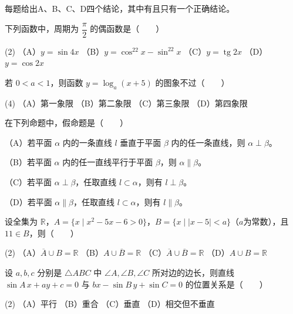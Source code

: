 每题给出A、B、C、D四个结论，其中有且只有一个正确结论。

\begin{question}
下列函数中，周期为 $\dfrac\pi2$ 的偶函数是\mbox{（　　）}

\begin{gkopts}(2)
\task （A）$y=\sin4x$
\task （B）$y=\cos^22x-\sin^22x$
\task （C）$y=\operatorname{tg}2x$
\task （D）$y=\cos2x$
\end{gkopts}

\end{question}
\begin{question}
若 $0<a<1$，则函数 $y=\log_a(x+5)$ 的图象不过\mbox{（　　）}

\begin{gkopts}(4)
\task （A）第一象限
\task （B）第二象限
\task （C）第三象限
\task （D）第四象限
\end{gkopts}

\end{question}
\begin{question}
在下列命题中，假命题是\mbox{（　　）}

（A）若平面 $\alpha$ 内的一条直线 $l$ 垂直于平面 $\beta$ 内的任一条直线，则 $\alpha\perp\beta$。

（B）若平面 $\alpha$ 内的任一直线平行于平面 $\beta$，则 $\alpha\parallel\beta$。

（C）若平面 $\alpha\perp\beta$，任取直线 $l\subset\alpha$，则有 $l\perp\beta$。

（D）若平面 $\alpha\parallel\beta$，任取直线 $l\subset\alpha$，则有 $l\parallel\beta$。

\end{question}
\begin{question}
设全集为 $\mathbb R$，$A=\{x\mid x^2-5x-6>0\}$，$B=\{x\mid |x-5|<a\}$（$a$为常数），且 $11\in B$，则\mbox{（　　）}

\begin{gkopts}(2)
\task （A）$\overline A\cup B=\mathbb R$
\task （B）$A\cup\overline B=\mathbb R$
\task （C）$\overline A\cup\overline B=\mathbb R$
\task （D）$A\cup B=\mathbb R$
\end{gkopts}

\end{question}
\begin{question}
设 $a,b,c$ 分别是 $\triangle ABC$ 中 $\angle A,\angle B,\angle C$ 所对边的边长，则直线
$\sin A\,x+ay+c=0$ 与 $bx-\sin B\,y+\sin C=0$ 的位置关系是\mbox{（　　）}

\begin{gkopts}(2)
\task （A）平行
\task （B）重合
\task （C）垂直
\task （D）相交但不垂直
\end{gkopts}

\end{question}

